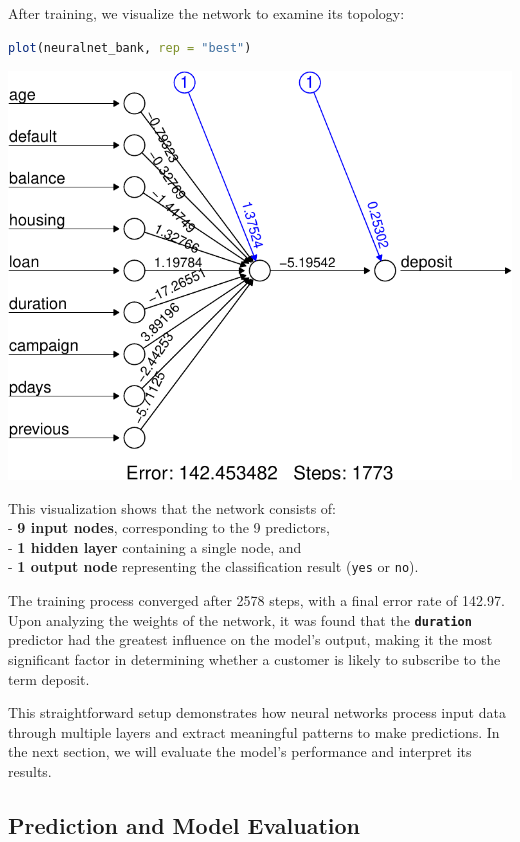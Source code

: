 \documentclass[
]{book}
\newcommand{\passthrough}[1]{#1}
\theoremstyle{definition}
\theoremstyle{definition}
\theoremstyle{definition}
\theoremstyle{definition}
\theoremstyle{remark}
\begin{document}
After training, we visualize the network to examine its topology:

\begin{lstlisting}[language=R]
plot(neuralnet_bank, rep = "best")
\end{lstlisting}

\begin{center}\includegraphics[width=0.7\linewidth]{nn_files/figure-latex/unnamed-chunk-11-1} \end{center}

This visualization shows that the network consists of:\\
- \textbf{9 input nodes}, corresponding to the 9 predictors,\\
- \textbf{1 hidden layer} containing a single node, and\\
- \textbf{1 output node} representing the classification result (\passthrough{\lstinline!yes!} or \passthrough{\lstinline!no!}).

The training process converged after 2578 steps, with a final error rate of 142.97. Upon analyzing the weights of the network, it was found that the \textbf{\passthrough{\lstinline!duration!}} predictor had the greatest influence on the model's output, making it the most significant factor in determining whether a customer is likely to subscribe to the term deposit.

This straightforward setup demonstrates how neural networks process input data through multiple layers and extract meaningful patterns to make predictions. In the next section, we will evaluate the model's performance and interpret its results.

\subsection*{Prediction and Model Evaluation}\label{prediction-and-model-evaluation-1}
\end{document}

